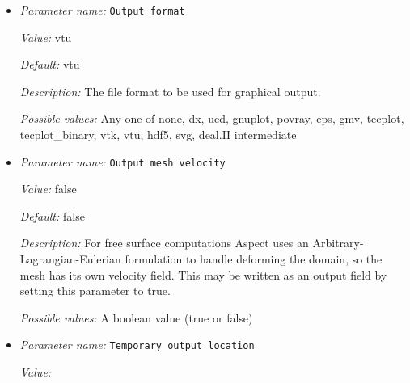 \begin{itemize}
{\it Value:} 16


{\it Default:} 16


{\it Description:} VTU file output supports grouping files from several CPUs into a given number of files using MPI I/O when writing on a parallel filesystem. Select 0 for no grouping. This will disable parallel file output and instead write one file per processor. A value of 1 will generate one big file containing the whole solution, while a larger value will create that many files (at most as many as there are MPI ranks).


{\it Possible values:} An integer $n$ such that $0\leq n \leq 2147483647$
\item {\it Parameter name:} {\tt Output format}
\label{parameters:Postprocess/Visualization/Output format}


{\it Value:} vtu


{\it Default:} vtu


{\it Description:} The file format to be used for graphical output.


{\it Possible values:} Any one of none, dx, ucd, gnuplot, povray, eps, gmv, tecplot, tecplot\_binary, vtk, vtu, hdf5, svg, deal.II intermediate
\item {\it Parameter name:} {\tt Output mesh velocity}
\label{parameters:Postprocess/Visualization/Output mesh velocity}


{\it Value:} false


{\it Default:} false


{\it Description:} For free surface computations Aspect uses an Arbitrary-Lagrangian-Eulerian formulation to handle deforming the domain, so the mesh has its own velocity field.  This may be written as an output field by setting this parameter to true.


{\it Possible values:} A boolean value (true or false)
\item {\it Parameter name:} {\tt Temporary output location}
\label{parameters:Postprocess/Visualization/Temporary output location}


{\it Value:} 



\end{itemize}
